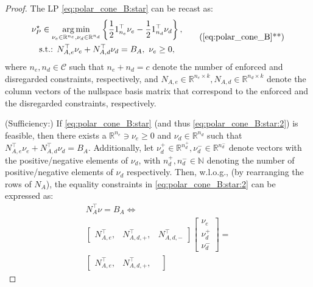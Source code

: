 \documentclass[letterpaper, 10 pt, conference]{ieeeconf}  %
\begin{document}
\begin{proof}
The LP \eqref{eq:polar_cone_B:star} can be recast as:
    \begin{equation}\label{eq:polar_cone_B:star:2}
    \begin{gathered}
    \nu^\star_{P}  \in \underset{\nu_e\in\mathbb{R}^{n_e},\nu_d\in\mathbb{R}^{n_d}}{\arg\min}\left\{ \frac{1}{2}{1}_{n_e}^\top \nu_e - \frac{1}{2}{1}_{n_d}^\top \nu_d \right\}, \\
    \textrm{s.t.: } N_{A,e}^\top \nu_e +  N_{A,d}^\top \nu_d 
    = B_{A}, \  \nu_e \geq 0,
    \end{gathered}   
    \tag{\ref{eq:polar_cone_B}**}
\end{equation}
where $n_e,n_d \in \mathcal{C}$ such that $n_e + n_d = c$ denote the number of enforced and disregarded constraints, respectively, and $N_{A,e}\in\mathbb{R}^{ n_e \times k}, N_{A,d}\in\mathbb{R}^{ n_d \times k}$ denote the column vectors of the nullspace basis matrix that correspond to the enforced and the disregarded constraints, respectively.
\par 
(Sufficiency:) If \eqref{eq:polar_cone_B:star} (and thus \eqref{eq:polar_cone_B:star:2}) is feasible, then there exists a $\mathbb{R}^{n_e}\ni\nu_e \geq 0$ and $\nu_d \in \mathbb{R}^{n_d}$ such that $N_{A,e}^\top \nu_e +  N_{A,d}^\top \nu_d 
    = B_{A}$. Additionally, let $\nu_d^+ \in \mathbb{R}^{n_d^+},\nu_d^-\in \mathbb{R}^{n_d^-}$ denote vectors with the positive/negative elements of $\nu_d$, with $n_d^+,n_d^- \in\mathbb{N}$ denoting the number of positive/negative elements of $\nu_d$ respectively. Then, w.l.o.g., (by rearranging the rows of $N_A$), the equality constraints in \eqref{eq:polar_cone_B:star:2} can be expressed as:
\begin{equation}\label{eq:polar_cone_B:star:3}
\begin{gathered}
   N_A^\top \nu = B_{A} \Leftrightarrow \\  
    \begin{bmatrix}
         N_{A,e}^\top, & 
        N_{A,d,+}^\top,  &
         N_{A,d,-}^\top 
     \end{bmatrix}
     \begin{bmatrix}
        \nu_e \\ 
        \nu_d^+ \\
        \nu_d^-
     \end{bmatrix} = \\
     \begin{bmatrix}
             N_{A,e}^\top, & 
             N_{A,d,+}^\top,  &

\end{bmatrix}
\end{gathered}
\end{equation}
\end{proof}
\end{document}
